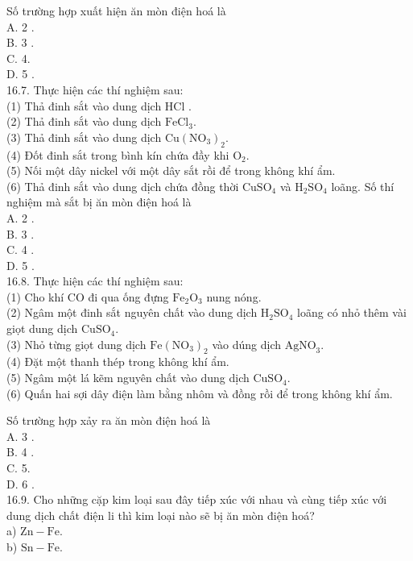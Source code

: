 \documentclass[10pt]{article}
\begin{document}
Số trường hợp xuất hiện ăn mòn điện hoá là\\
A. 2 .\\
B. 3 .\\
C. 4.\\
D. 5 .\\
16.7. Thực hiện các thí nghiệm sau:\\
(1) Thả đinh sắt vào dung dịch HCl .\\
(2) Thả đinh sắt vào dung dịch $\mathrm{FeCl}_{3}$.\\
(3) Thả đinh sắt vào dung dịch $\mathrm{Cu}\left(\mathrm{NO}_{3}\right)_{2}$.\\
(4) Đốt đinh sắt trong bình kín chứa đầy khi $\mathrm{O}_{2}$.\\
(5) Nối một dây nickel với một dây sắt rồi để trong không khí ẩm.\\
(6) Thả đinh sắt vào dung dịch chứa đồng thời $\mathrm{CuSO}_{4}$ và $\mathrm{H}_{2} \mathrm{SO}_{4}$ loãng. Số thí nghiệm mà sắt bị ăn mòn điện hoá là\\
A. 2 .\\
B. 3 .\\
C. 4 .\\
D. 5 .\\
16.8. Thực hiện các thí nghiệm sau:\\
(1) Cho khí CO đi qua ống đựng $\mathrm{Fe}_{2} \mathrm{O}_{3}$ nung nóng.\\
(2) Ngâm một đinh sắt nguyên chất vào dung dịch $\mathrm{H}_{2} \mathrm{SO}_{4}$ loãng có nhỏ thêm vài giọt dung dịch $\mathrm{CuSO}_{4}$.\\
(3) Nhỏ từng giọt dung dịch $\mathrm{Fe}\left(\mathrm{NO}_{3}\right)_{2}$ vào dúng dịch $\mathrm{AgNO}_{3}$.\\
(4) Đặt một thanh thép trong không khí ẩm.\\
(5) Ngâm một lá kẽm nguyên chất vào dung dịch $\mathrm{CuSO}_{4}$.\\
(6) Quấn hai sợi dây điện làm bằng nhôm và đồng rồi để trong không khí ẩm.

Số trường hợp xảy ra ăn mòn điện hoá là\\
A. 3 .\\
B. 4 .\\
C. 5.\\
D. 6 .\\
16.9. Cho những cặp kim loại sau đây tiếp xúc với nhau và cùng tiếp xúc với dung dịch chất điện li thì kim loại nào sẽ bị ăn mòn điện hoá?\\
a) $\mathrm{Zn}-\mathrm{Fe}$.\\
b) $\mathrm{Sn}-\mathrm{Fe}$.
\end{document}
